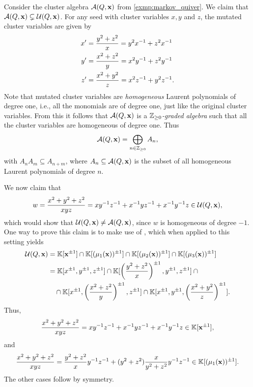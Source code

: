 \begin{example}
	Consider the cluster algebra $\mathcal{A}(Q, \mathbf{x})$ from \cref{exmp:markov_quiver}. We claim that $\mathcal{A}(Q, \mathbf{x}) \subsetneq \mathcal{U}(Q, \mathbf{x})$. For any seed with cluster variables $x,y$ and $z$, the mutated cluster variables are given by
	\begin{align*}
		x' & = \frac{y^2 + z^2}{x} = y^2 x^{-1} + z^2 x^{-1}  \\
		y' & = \frac{x^2 + z^2}{y} = x^2 y^{-1} + z^2 y^{-1}  \\
		z' & = \frac{x^2 + y^2}{z} = x^2 z^{-1} + y^2 z^{-1}.
	\end{align*}
	Note that mutated cluster variables are
	\emph{homogeneous} Laurent polynomials of degree one,
	i.e., all the monomials are of degree one, just like the original cluster variables.
	From this it follows that $\mathcal{A}(Q, \mathbf{x})$ is a $\mathbb{Z}_{\geq 0}$\emph{-graded
		algebra} such that all the cluster variables are homogeneous of
	degree one. Thus
	\begin{equation*}
		\mathcal{A}(Q, \mathbf{x}) = \bigoplus_{n \in \mathbb{Z}_{\geq 0}} A_n,
	\end{equation*}
	with $A_n A_m \subseteq A_{n+m}$, where $A_n \subseteq \mathcal{A}(Q, \mathbf{x})$ is the subset of
	all homogeneous Laurent polynomials of degree $n$.

	We now claim that
	\begin{equation*}
		w = \frac{x^2 + y^2 + z^2}{xyz} = xy^{-1} z^{-1}+ x^{-1} y z^{-1} + x^{-1} y ^{-1} z \in \mathcal{U}(Q, \mathbf{x}),
	\end{equation*}
	which would show that $\mathcal{U}(Q, \mathbf{x}) \neq \mathcal{A}(Q, \mathbf{x})$, since $w$ is homogeneous of
	degree $-1$. One way to prove this claim is to make use of \cite[Corollary
		1.7]{BerensteinFominZelevinsky2005CA3UpperBoundsDBC}, which when applied to this
	setting yields
	\begin{align*}
		\mathcal{U}(Q, \mathbf{x})
		 & = \mathbb{K}[\mathbf{x}^{\pm 1}] \cap \mathbb{K}[(\mu_1(\mathbf{x}))^{\pm 1}] \cap \mathbb{K}[(\mu_2(\mathbf{x}))^{\pm 1}] \cap \mathbb{K}[(\mu_3(\mathbf{x}))^{\pm 1}]                                       \\
		 & =
		\mathbb{K}[x^{\pm 1}, y^{\pm 1}, z^{\pm 1}] \cap \mathbb{K}[\left(\frac{y^2 + z^2}{x}\right)^{\pm 1}, y^{\pm 1}, z^{\pm 1}] \cap {}                                      \\
		 & \quad {}\cap\mathbb{K}[x^{\pm 1}, \left(\frac{x^2 + z^2}{y}\right)^{\pm 1}, z^{\pm 1}]\cap \mathbb{K}[x^{\pm 1},y^{\pm 1}, \left(\frac{x^2 + y^2}{z}\right)^{\pm 1}].
	\end{align*}
	Thus,
	\begin{equation*}
		\frac{x^2 + y^2 + z^2}{xyz} = xy^{-1} z^{-1}+ x^{-1} y z^{-1} + x^{-1} y ^{-1} z \in \mathbb{K}[\mathbf{x}^{\pm 1}],
	\end{equation*}
	and
	\begin{equation*}
		\frac{x^2 + y^2 + z^2}{xyz} = \frac{y^2 + z^2}{x}y^{-1} z^{-1} + (y^2  + z^2)\frac{x}{y^2 + z^2}y ^{-1} z ^{-1} \in \mathbb{K}[(\mu_1(\mathbf{x}))^{\pm 1}].
	\end{equation*}
	The other cases follow by symmetry.


\end{example}
